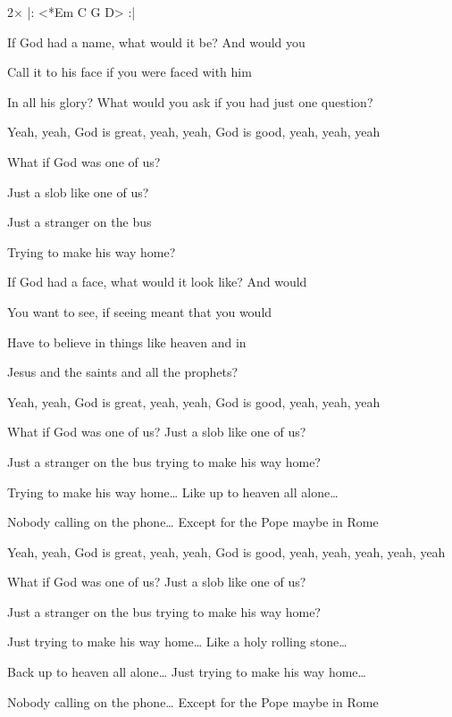 

2× |: <*Em C G D> :|

\zs
If God had a name, what would it be? And would you

Call it to his face if you were faced with him

In all his glory? What would you ask if you had just one question?

Yeah, yeah, God is great, yeah, yeah, God is good, yeah, yeah, yeah
\ks

\zr
What if God was one of us?

Just a slob like one of us?

Just a stranger on the bus

Trying to make his way home?
\kr

\zs
If God had a face, what would it look like? And would

You want to see, if seeing meant that you would

Have to believe in things like heaven and in 

Jesus and the saints and all the prophets?

Yeah, yeah, God is great, yeah, yeah, God is good, yeah, yeah, yeah
\ks

\zr
What if God was one of us?  Just a slob like one of us?

Just a stranger on the bus trying to make his way home?

Trying to make his way home…  Like up to heaven all alone…

Nobody calling on the phone…  Except for the Pope maybe in Rome

Yeah, yeah, God is great, yeah, yeah, God is good, yeah, yeah, yeah, yeah, yeah
\kr

\zr
What if God was one of us?  Just a slob like one of us?

Just a stranger on the bus trying to make his way home?

Just trying to make his way home…
Like a holy rolling stone…

Back up to heaven all alone…
Just trying to make his way home…

Nobody calling on the phone…
Except for the Pope maybe in Rome
\kr

\kp
